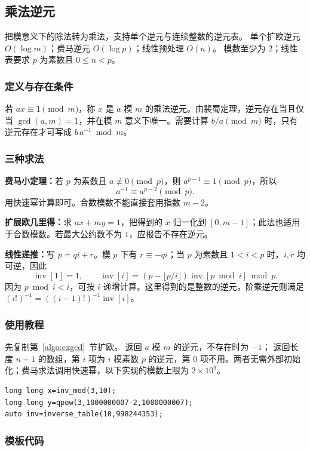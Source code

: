 \subsection{乘法逆元}
\label{algo:inverse}
\AlgorithmInfo
    {把模意义下的除法转为乘法，支持单个逆元与连续整数的逆元表。}
    {单个扩欧逆元 $O(\log m)$；费马逆元 $O(\log p)$；线性预处理 $O(n)$。}
    {模数至少为 $2$；线性表要求 $p$ 为素数且 $0\leq n<p$。}

\subsubsection*{定义与存在条件}
若 $ax\equiv1\pmod m$，称 $x$ 是 $a$ 模 $m$ 的乘法逆元。由裴蜀定理，逆元存在当且仅当 $\gcd(a,m)=1$，并在模 $m$ 意义下唯一。需要计算 $b/a\pmod m$ 时，只有逆元存在才可写成 $b\,a^{-1}\bmod m$。

\subsubsection*{三种求法}
\textbf{费马小定理：}若 $p$ 为素数且 $a\not\equiv0\pmod p$，则 $a^{p-1}\equiv1\pmod p$，所以
\[
    a^{-1}\equiv a^{p-2}\pmod p.
\]
用快速幂计算即可。合数模数不能直接套用指数 $m-2$。

\textbf{扩展欧几里得：}求 $ax+my=1$，把得到的 $x$ 归一化到 $[0,m-1]$；此法也适用于合数模数。若最大公约数不为 $1$，应报告不存在逆元。

\textbf{线性递推：}写 $p=qi+r$。模 $p$ 下有 $r\equiv-qi$；当 $p$ 为素数且 $1<i<p$ 时，$i,r$ 均可逆，因此
\[
    \operatorname{inv}[1]=1,\qquad
    \operatorname{inv}[i]=(p-\lfloor p/i\rfloor)\operatorname{inv}[p\bmod i]\bmod p.
\]
因为 $p\bmod i<i$，可按 $i$ 递增计算。这里得到的是整数的逆元，阶乘逆元则满足 $(i!)^{-1}=((i-1)!)^{-1}\operatorname{inv}[i]$。

\subsubsection*{使用教程}
先复制第~\ref{algo:exgcd}~节扩欧。 返回 $a$ 模 $m$ 的逆元，不存在时为 $-1$； 返回长度 $n+1$ 的数组，第 $i$ 项为 $i$ 模素数 $p$ 的逆元，第 0 项不用。两者无需外部初始化；费马求法调用快速幂，以下实现的模数上限为 $2\times10^9$。
\begin{lstlisting}[style=mtycpp,numbers=none]
long long x=inv_mod(3,10);
long long y=qpow(3,1000000007-2,1000000007);
auto inv=inverse_table(10,998244353);
\end{lstlisting}

\subsubsection*{模板代码}
